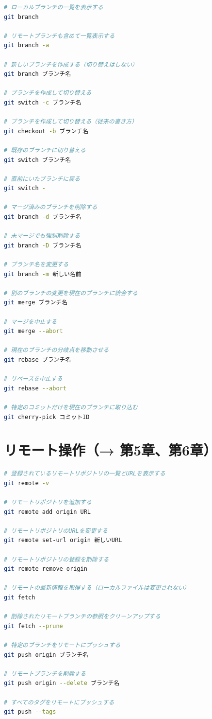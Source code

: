 \begin{lstlisting}[language=bash]
# ローカルブランチの一覧を表示する
git branch

# リモートブランチも含めて一覧表示する
git branch -a

# 新しいブランチを作成する（切り替えはしない）
git branch ブランチ名

# ブランチを作成して切り替える
git switch -c ブランチ名

# ブランチを作成して切り替える（従来の書き方）
git checkout -b ブランチ名

# 既存のブランチに切り替える
git switch ブランチ名

# 直前にいたブランチに戻る
git switch -

# マージ済みのブランチを削除する
git branch -d ブランチ名

# 未マージでも強制削除する
git branch -D ブランチ名

# ブランチ名を変更する
git branch -m 新しい名前

# 別のブランチの変更を現在のブランチに統合する
git merge ブランチ名

# マージを中止する
git merge --abort

# 現在のブランチの分岐点を移動させる
git rebase ブランチ名

# リベースを中止する
git rebase --abort

# 特定のコミットだけを現在のブランチに取り込む
git cherry-pick コミットID
\end{lstlisting}

\section{リモート操作（→ 第5章、第6章）}

\begin{lstlisting}[language=bash]
# 登録されているリモートリポジトリの一覧とURLを表示する
git remote -v

# リモートリポジトリを追加する
git remote add origin URL

# リモートリポジトリのURLを変更する
git remote set-url origin 新しいURL

# リモートリポジトリの登録を削除する
git remote remove origin

# リモートの最新情報を取得する（ローカルファイルは変更されない）
git fetch

# 削除されたリモートブランチの参照をクリーンアップする
git fetch --prune

# 特定のブランチをリモートにプッシュする
git push origin ブランチ名

# リモートブランチを削除する
git push origin --delete ブランチ名

# すべてのタグをリモートにプッシュする
git push --tags
\end{lstlisting}

